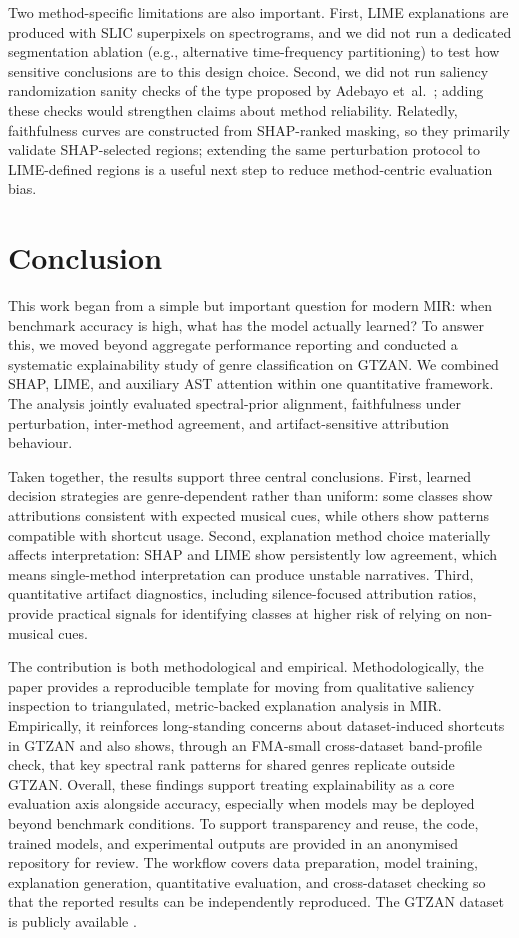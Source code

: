 \documentclass{article}
\begin{document}
Two method-specific limitations are also important. First, LIME explanations are produced with SLIC superpixels on spectrograms, and we did not run a dedicated segmentation ablation (e.g., alternative time-frequency partitioning) to test how sensitive conclusions are to this design choice. Second, we did not run saliency randomization sanity checks of the type proposed by Adebayo et~al.\ \cite{Adebayo2018}; adding these checks would strengthen claims about method reliability. Relatedly, faithfulness curves are constructed from SHAP-ranked masking, so they primarily validate SHAP-selected regions; extending the same perturbation protocol to LIME-defined regions is a useful next step to reduce method-centric evaluation bias.

\section{Conclusion}\label{sec:conclusion}

This work began from a simple but important question for modern MIR: when benchmark accuracy is high, what has the model actually learned? To answer this, we moved beyond aggregate performance reporting and conducted a systematic explainability study of genre classification on GTZAN. We combined SHAP, LIME, and auxiliary AST attention within one quantitative framework. The analysis jointly evaluated spectral-prior alignment, faithfulness under perturbation, inter-method agreement, and artifact-sensitive attribution behaviour.

Taken together, the results support three central conclusions. First, learned decision strategies are genre-dependent rather than uniform: some classes show attributions consistent with expected musical cues, while others show patterns compatible with shortcut usage. Second, explanation method choice materially affects interpretation: SHAP and LIME show persistently low agreement, which means single-method interpretation can produce unstable narratives. Third, quantitative artifact diagnostics, including silence-focused attribution ratios, provide practical signals for identifying classes at higher risk of relying on non-musical cues.

The contribution is both methodological and empirical. Methodologically, the paper provides a reproducible template for moving from qualitative saliency inspection to triangulated, metric-backed explanation analysis in MIR. Empirically, it reinforces long-standing concerns about dataset-induced shortcuts in GTZAN and also shows, through an FMA-small cross-dataset band-profile check, that key spectral rank patterns for shared genres replicate outside GTZAN. Overall, these findings support treating explainability as a core evaluation axis alongside accuracy, especially when models may be deployed beyond benchmark conditions.
To support transparency and reuse, the code, trained models, and experimental outputs are provided in an anonymised repository for review. The workflow covers data preparation, model training, explanation generation, quantitative evaluation, and cross-dataset checking so that the reported results can be independently reproduced. The GTZAN dataset is publicly available \cite{Tzanetakis2002}.
\end{document}
